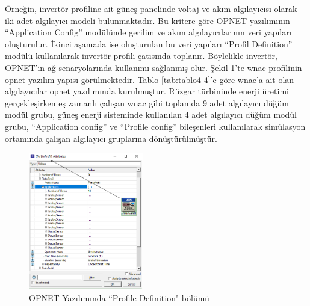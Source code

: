 Örneğin, invertör profiline ait güneş panelinde voltaj ve akım algılayıcısı olarak iki adet algılayıcı modeli bulunmaktadır. Bu kritere göre OPNET yazılımının “Application Config” modülünde gerilim ve akım algılayıcılarının veri yapıları oluşturulur. İkinci aşamada ise oluşturulan bu veri yapıları “Profil Definition” modülü kullanılarak invertör profili çatısında toplanır. Böylelikle invertör, OPNET’in ağ senaryolarında kullanımı sağlanmış olur. Şekil \ref{fig:4-5}’te \gls{wnac} profilinin \gls{opnet} yazılım yapısı görülmektedir. Tablo \ref{tab:tablo4-4}’e göre \gls{wnac}'a ait olan algılayıcılar \gls{opnet} yazılımında kurulmuştur. Rüzgar türbininde enerji üretimi gerçekleşirken eş zamanlı çalışan \gls{wnac} gibi toplamda 9 adet algılayıcı düğüm modül grubu, güneş enerji sisteminde kullanılan 4 adet algılayıcı düğüm modül grubu, “Application config” ve “Profile config” bileşenleri kullanılarak simülasyon ortamında çalışan algılayıcı gruplarına dönüştürülmüştür.
\begin{figure}[htbp]
\centerline{\includegraphics[width=5cm]{Resim/sekil4-5.png}}
\caption{OPNET Yazılımında “Profile Definition" bölümü}
\label{fig:4-5}
\end{figure}